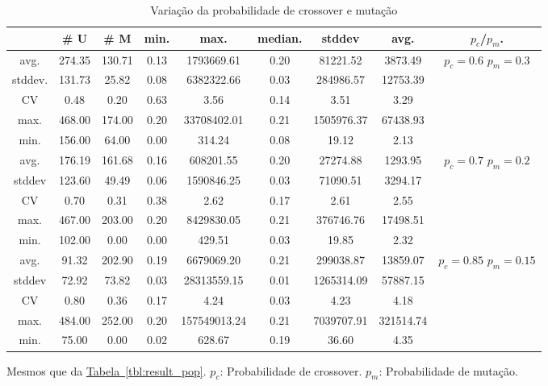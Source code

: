 \documentclass[a4paper]{paper}
\begin{document}
\begin{table}
  \center
  \caption{Variação da probabilidade de crossover e mutação}
  \label{tbl:var_cross_mut}
  \begin{tabular}{| c | c | c | c | c | c | c | c | c |}
    \hline
    &  \# U & \# M & min. & max. & median. & stddev & avg. & $p_c$/$p_m$. \\ \hline
    avg.    & 274.35 & 130.71 & 0.13 & 1793669.61 & 0.20 & 81221.52 & 3873.49 &  \\ 
    stddev. & 131.73 & 25.82 & 0.08 & 6382322.66 & 0.03 & 284986.57 & 12753.39 & \\ 
    CV      & 0.48 & 0.20 & 0.63 & 3.56 & 0.14 & 3.51 & 3.29 & \\ 
    max.    & 468.00 & 174.00 & 0.20 & 33708402.01 & 0.21 & 1505976.37 & 67438.93 & \\ 
    min.    & 156.00 & 64.00 & 0.00 & 314.24 & 0.08 & 19.12 & 2.13 & \\ \hline \hline
    avg.    & 176.19 & 161.68 & 0.16 & 608201.55 & 0.20 & 27274.88 & 1293.95 &  \\ 
    stddev  & 123.60 & 49.49 & 0.06 & 1590846.25 & 0.03 & 71090.51 & 3294.17 & \\ 
    CV      & 0.70 & 0.31 & 0.38 & 2.62 & 0.17 & 2.61 & 2.55 & \\ 
    max.    & 467.00 & 203.00 & 0.20 & 8429830.05 & 0.21 & 376746.76 & 17498.51 & \\ 
    min.    & 102.00 & 0.00 & 0.00 & 429.51 & 0.03 & 19.85 & 2.32 & \\ \hline \hline
    avg.    & 91.32 & 202.90 & 0.19 & 6679069.20 & 0.21 & 299038.87 & 13859.07 &  \\ 
    stddev  & 72.92 & 73.82 & 0.03 & 28313559.15 & 0.01 & 1265314.09 & 57887.15 & \\ 
    CV      & 0.80 & 0.36 & 0.17 & 4.24 & 0.03 & 4.23 & 4.18 & \\ 
    max.    & 484.00 & 252.00 & 0.20 & 157549013.24 & 0.21 & 7039707.91 & 321514.74 & \\ 
    min.    & 75.00 & 0.00 & 0.02 & 628.67 & 0.19 & 36.60 & 4.35 & \\ \hline
  \end{tabular}
    \begin{minipage}{0.9\textwidth}
    {\footnotesize
      Mesmos que da \hyperref[tbl:result_pop]{Tabela~\ref*{tbl:result_pop}}.
      $p_c$: Probabilidade de crossover. $p_m$: Probabilidade de mutação.
    }
  \end{minipage}
\end{table}
\end{document}
